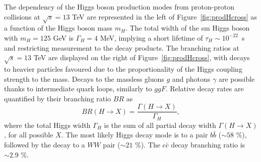 The dependency of the Higgs boson production modes from proton-proton collisions at $\sqrt{s} = 13$ TeV are represented in the left of Figure~\ref{fig:prodHcross} as a function of the Higgs boson mass $m_H$. The total width of the \gls{sm} Higgs boson with $m_H = 125$ GeV is $\Gamma_H = 4$ MeV, implying a short lifetime of $\tau_H \sim10^{-22}$~s and restricting measurement to the decay products. The branching ratios at $\sqrt{s} = 13$ TeV are displayed on the right of Figure~\ref{fig:prodHcross}, with decays to heavier particles favoured due to the proportionality of the Higgs coupling strength to the mass. Decays to the massless gluons $g$ and photons $\gamma$ are possible thanks to intermediate quark loops, similarly to $ggF$. Relative decay rates are quantified by their branching ratio $BR$ as
\begin{equation}
    BR (H \rightarrow X) = \frac{\Gamma (H\rightarrow X)}{\Gamma_H},
\end{equation}
where the total Higgs width $\Gamma_H$ is the sum of all partial decay width $\Gamma (H\rightarrow X)$, for all possible $X$. The most likely Higgs decay mode is to a pair $b\bar{b}$ ($\sim58$ \%), followed by the decay to a $WW$ pair ($\sim21$ \%). The $c\bar{c}$ decay branching ratio is $\sim2.9$ \%. \\

